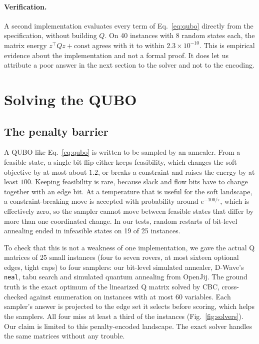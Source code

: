 \documentclass[11pt]{article}
\newcommand{\code}[1]{\texttt{#1}}
\begin{document}
\paragraph{Verification.}
A second implementation evaluates every term of Eq.~\eqref{eq:qubo} directly
from the specification, without building $Q$. On 40 instances with 8 random
states each, the matrix energy $z^{\top}Qz+\mathrm{const}$ agrees with it to
within $2.3\times10^{-10}$. This is empirical evidence about the
implementation and not a formal proof. It does let us attribute a poor answer
in the next section to the solver and not to the encoding.

\section{Solving the QUBO}
\label{sec:solvers}

\subsection{The penalty barrier}

A QUBO like Eq.~\eqref{eq:qubo} is written to be sampled by an annealer. From
a feasible state, a single bit flip either keeps feasibility, which changes the
soft objective by at most about $1.2$, or breaks a constraint and raises the
energy by at least $100$. Keeping feasibility is rare, because slack and flow
bits have to change together with an edge bit. At a temperature that is
useful for the soft landscape, a constraint-breaking move is accepted with
probability around $e^{-100/\tau}$, which is effectively zero, so the
sampler cannot move between feasible states that differ by more than one
coordinated change. In our tests, random restarts of bit-level annealing
ended in infeasible states on 19 of 25 instances.

To check that this is not a weakness of one implementation, we gave the
actual Q matrices of 25 small instances (four to seven rovers, at most sixteen
optional edges, tight caps) to four samplers: our bit-level simulated
annealer, D-Wave's \code{neal}, tabu search and simulated quantum annealing
from OpenJij. The ground truth is the exact optimum of the linearized Q matrix
solved by CBC, cross-checked against enumeration on instances with at most 60
variables. Each sampler's answer is projected to the edge set it selects
before scoring, which helps the samplers. All four miss at least a third of
the instances (Fig.~\ref{fig:solvers}). Our claim is limited to this
penalty-encoded landscape. The exact solver handles the same matrices without
any trouble.
\end{document}
